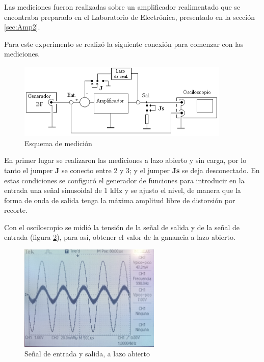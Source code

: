 Las mediciones fueron realizadas sobre un amplificador realimentado que se encontraba preparado en el Laboratorio de Electrónica, presentado en la sección \ref{sec:Amp2}. 


Para este experimento se realizó la siguiente conexión para comenzar con las mediciones.

\begin{figure}[H]
    \centering
    \includegraphics[width=0.9\textwidth]{Imagenes/conexion_p5.png}
    \caption{Esquema de medición}
    \label{fig:esq_conexion}
\end{figure}

En primer lugar se realizaron las mediciones a lazo abierto y sin carga, por lo tanto el jumper \textbf{J} se conecto entre 2 y 3; y el jumper \textbf{Js} se deja desconectado. En estas condiciones se configuró el generador de funciones para introducir en la entrada una señal sinusoidal de 1 kHz y  se ajusto el nivel, de manera que la forma de onda de salida tenga la máxima amplitud libre de distorsión por recorte.

Con el osciloscopio se midió la tensión de la señal de salida y de la señal de entrada (figura \ref{fig:amp2LA}), para así, obtener el valor de la ganancia a lazo abierto. 

\begin{figure}[H]
    \centering
    \includegraphics[width=0.6\textwidth]{Imagenes/Amp2LA.jpeg}
    \caption{Señal de entrada y salida, a lazo abierto}
    \label{fig:amp2LA}
\end{figure}

